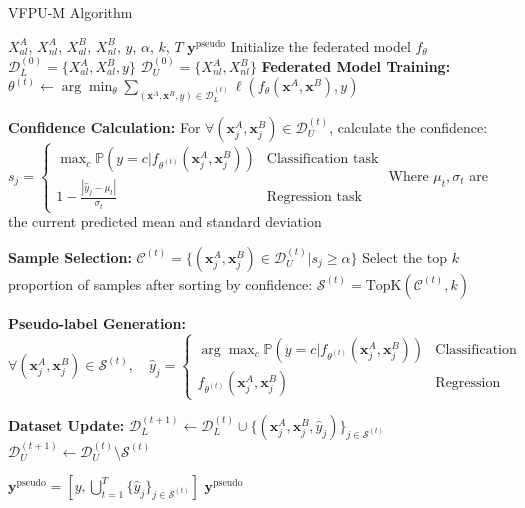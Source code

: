 \documentclass{article}  %
\begin{document}
	\begin{algorithm}
		\caption{VFPU-M Algorithm}
		\begin{algorithmic}[1]
			\Require $X_{al}^A$, $X_{nl}^A$, $X_{al}^B$, $X_{nl}^B$, $y$, $\alpha$, $k$, $T$
			\Ensure $\mathbf{y}^{\text{pseudo}}$
			\State Initialize the federated model $f_\theta$
			\State $\mathcal{D}_{L}^{(0)} = \{X_{al}^A, X_{al}^B, y\}$
			\State $\mathcal{D}_{U}^{(0)} = \{X_{nl}^A, X_{nl}^B\}$
			\State \textbf{Federated Model Training:}
			\State $\theta^{(t)} \leftarrow \arg\min_\theta \sum_{(\mathbf{x}^A,\mathbf{x}^B,y)\in\mathcal{D}_L^{(t)}} \ell(f_\theta(\mathbf{x}^A,\mathbf{x}^B), y)$
			
			\State \textbf{Confidence Calculation:}
			\State For $\forall (\mathbf{x}^A_j,\mathbf{x}^B_j) \in \mathcal{D}_U^{(t)}$, calculate the confidence:
			\State $s_j = \begin{cases} 
				\max_{c} \mathbb{P}(y=c|f_{\theta^{(t)}}(\mathbf{x}^A_j,\mathbf{x}^B_j)) & \text{Classification task} \\
				1 - \frac{|\hat{y}_j - \mu_t|}{\sigma_t} & \text{Regression task}
			\end{cases}$
			\State Where $\mu_t,\sigma_t$ are the current predicted mean and standard deviation
			
			\State \textbf{Sample Selection:}
			\State $\mathcal{C}^{(t)} = \{(\mathbf{x}^A_j,\mathbf{x}^B_j) \in \mathcal{D}_U^{(t)} | s_j \geq \alpha\}$
			\State Select the top $k$ proportion of samples after sorting by confidence:
			\State $\mathcal{S}^{(t)} = \text{TopK}(\mathcal{C}^{(t)}, k)$
			
			\State \textbf{Pseudo-label Generation:}
			\State $\forall (\mathbf{x}^A_j,\mathbf{x}^B_j) \in \mathcal{S}^{(t)}, \quad \hat{y}_j = \begin{cases}
				\arg\max_c \mathbb{P}(y=c|f_{\theta^{(t)}}(\mathbf{x}^A_j,\mathbf{x}^B_j)) & \text{Classification} \\
				f_{\theta^{(t)}}(\mathbf{x}^A_j,\mathbf{x}^B_j) & \text{Regression}
			\end{cases}$
			
			\State \textbf{Dataset Update:}
			\State $\mathcal{D}_L^{(t+1)} \leftarrow \mathcal{D}_L^{(t)} \cup \{(\mathbf{x}^A_j,\mathbf{x}^B_j,\hat{y}_j)\}_{j\in\mathcal{S}^{(t)}}$
			\State $\mathcal{D}_U^{(t+1)} \leftarrow \mathcal{D}_U^{(t)} \setminus \mathcal{S}^{(t)}$
			\EndFor
			
			\State $\mathbf{y}^{\text{pseudo}} = \left[ y, \bigcup_{t=1}^{T} \{\hat{y}_j\}_{j \in \mathcal{S}^{(t)}} \right]$
			\Return $\mathbf{y}^{\text{pseudo}}$
		\end{algorithmic}
	\end{algorithm}
	
	
\end{document}
